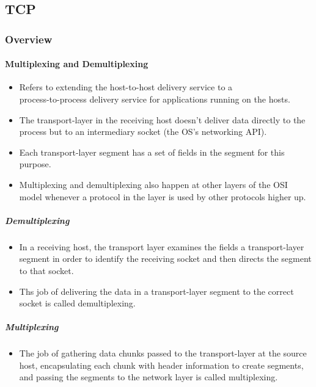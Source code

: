\documentclass{article}
\begin{document}
\subsection{TCP}

\subsubsection{Overview}

\paragraph{Multiplexing and Demultiplexing}

\begin{itemize}
    \item Refers to extending the host-to-host delivery service to a \\ process-to-process delivery service for applications running on the hosts.
    \item The transport-layer in the receiving host doesn't deliver data directly to the process but to an intermediary socket (the OS's networking API).
    \item Each transport-layer segment has a set of fields in the segment for this purpose.
    \item Multiplexing and demultiplexing also happen at other layers of the OSI model whenever a protocol in the layer is used by other protocols higher up.
\end{itemize}

\subparagraph{Demultiplexing}

\begin{itemize}
    \item In a receiving host, the transport layer examines the fields a transport-layer segment in order to identify the receiving socket and then directs the segment to that socket.
    \item Ths job of delivering the data in a transport-layer segment to the correct socket is called demultiplexing.
\end{itemize}

\subparagraph{Multiplexing}

\begin{itemize}
    \item The job of gathering data chunks passed to the transport-layer at the source host, encapsulating each chunk with header information to create segments, and passing the segments to the network layer is called multiplexing.
\end{itemize}
\end{document}
